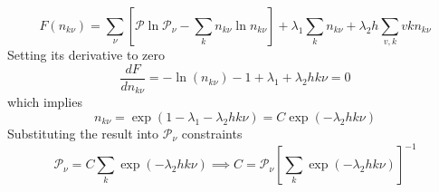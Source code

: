 \documentclass[../../../Main.tex]{subfiles}
\begin{document}
\begin{equation*}
    F(n_{k\nu})=\sum_\nu \left[\mathcal{P}\ln \mathcal{P}_\nu - \sum_{k} n_{k\nu}\ln n_{k\nu} \right]+ 
    \lambda_1\sum_{k}n_{k\nu}+
    \lambda_2h\sum_{v,k}vkn_{k\nu}
\end{equation*}
Setting its derivative to zero
\begin{equation*}
    \frac{dF}{dn_{k\nu}}=-\ln(n_{k\nu})-1+\lambda_1+\lambda_2hk\nu=0
\end{equation*}
which implies
\begin{equation*}
    n_{k\nu}=\exp\left(1-\lambda_1-\lambda_2hk\nu\right)=C\exp\left(-\lambda_2hk\nu\right)
\end{equation*}
Substituting the result into $\mathcal{P}_\nu$ constraints
\begin{equation*}
    \mathcal{P}_\nu=C\sum_{k } \exp\left(-\lambda_2hk\nu\right) \implies C=\mathcal{P}_\nu\left[\sum_{k } \exp\left(-\lambda_2hk\nu\right)\right]^{-1}
\end{equation*}
\end{document}

